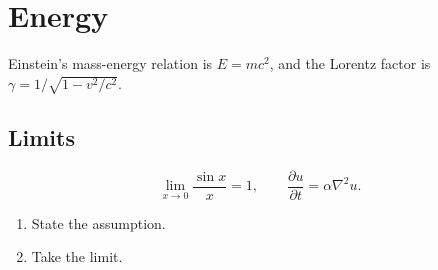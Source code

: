 \documentclass{article}
\begin{document}
\section{Energy}
Einstein's mass-energy relation is $E = mc^2$, and the Lorentz factor is $\gamma = 1/\sqrt{1 - v^2/c^2}$.

\subsection{Limits}
\[
\lim_{x \to 0} \frac{\sin x}{x} = 1, \qquad \frac{\partial u}{\partial t} = \alpha \nabla^2 u.
\]

\begin{enumerate}
    \item State the assumption.
    \item Take the limit.
\end{enumerate}
\end{document}

